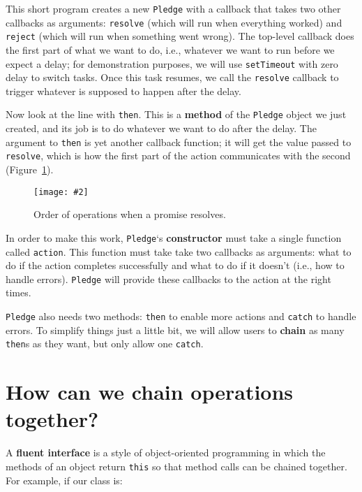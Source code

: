 \documentclass[krantzl]{krantz}
\newcommand{\figpdf}[4]{\begin{figure}%
\centering%
\texttt{[image: \#2]}%
\caption{#3}%
\label{#1}%
\end{figure}}
\newcommand{\figref}[1]{Figure~\ref{#1}}
\newcommand{\glossref}[1]{\textbf{#1}}
\begin{document}
This short program creates a new \texttt{Pledge}
with a callback that takes two other callbacks as arguments:
\texttt{resolve} (which will run when everything worked)
and \texttt{reject} (which will run when something went wrong).
The top-level callback does the first part of what we want to do,
i.e.,
whatever we want to run before we expect a delay;
for demonstration purposes, we will use \texttt{setTimeout} with zero delay to switch tasks.
Once this task resumes,
we call the \texttt{resolve} callback to trigger whatever is supposed to happen after the delay.


Now look at the line with \texttt{then}.
This is a \glossref{method} of the \texttt{Pledge} object we just created,
and its job is to do whatever we want to do after the delay.
The argument to \texttt{then} is yet another callback function;
it will get the value passed to \texttt{resolve},
which is how the first part of the action communicates with the second
(\figref{async-programming-resolve}).

\figpdf{async-programming-resolve}{./async-programming/resolve.pdf}{Order of operations when a promise resolves.}{0.6}


In order to make this work,
\texttt{Pledge}‘s \glossref{constructor} must take a single function called \texttt{action}.
This function must take take two callbacks as arguments:
what to do if the action completes successfully
and what to do if it doesn’t (i.e., how to handle errors).
\texttt{Pledge} will provide these callbacks to the action at the right times.


\texttt{Pledge} also needs two methods:
\texttt{then} to enable more actions
and \texttt{catch} to handle errors.
To simplify things just a little bit,
we will allow users to \glossref{chain} as many \texttt{then}s as they want,
but only allow one \texttt{catch}.

\section{How can we chain operations together?}\label{async-programming-fluent}


A \glossref{fluent interface}
is a style of object-oriented programming
in which the methods of an object return \texttt{this}
so that method calls can be chained together.
For example,
if our class is:
\end{document}
